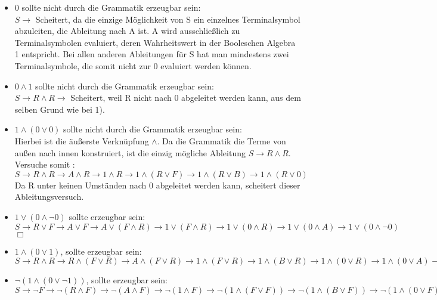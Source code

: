 \documentclass[11pt]{article}
\begin{document}
\begin{itemize}
\item[Bsp. 1:] $0$ sollte nicht durch die Grammatik erzeugbar sein:
\\$S\rightarrow$ Scheitert, da die einzige Möglichkeit von S ein einzelnes Terminalsymbol abzuleiten, die Ableitung nach A ist. A wird ausschließlich zu Terminalsymbolen evaluiert, deren Wahrheitswert in der Booleschen Algebra 1 entspricht. Bei allen anderen Ableitungen für S hat man mindestens zwei Terminalsymbole, die somit nicht zur 0 evaluiert werden können.  

\item[Bsp. 2:] $0\wedge 1$ sollte nicht durch die Grammatik erzeugbar sein:
\\$S\rightarrow R \wedge R \rightarrow $ Scheitert, weil R nicht nach 0 abgeleitet werden kann, aus dem selben Grund wie bei 1).

\item[Bsp. 3:] $1\wedge (0\vee 0)$ sollte nicht durch die Grammatik erzeugbar sein:
\\Hierbei ist die äußerste Verknüpfung $\wedge$. Da die Grammatik die Terme von außen nach innen konstruiert, ist die einzig mögliche Ableitung $S \rightarrow R\wedge R$.  
\\Versuche somit : $S\rightarrow R\wedge R \rightarrow A \wedge R\rightarrow 1 \wedge R\rightarrow 1 \wedge (R\vee F) \rightarrow 1 \wedge (R\vee B) \rightarrow 1 \wedge (R\vee 0)$
\\Da R unter keinen Umständen nach 0 abgeleitet werden kann, scheitert dieser Ableitungsversuch. 

\item[Bsp. 4:] $1 \vee (0\wedge \neg 0)$ sollte erzeugbar sein:
\\$S \rightarrow R \vee F \rightarrow A \vee F \rightarrow A \vee (F\wedge R) \rightarrow 1 \vee (F \wedge R) \rightarrow 1 \vee (0 \wedge R) \rightarrow 1 \vee (0 \wedge A) \rightarrow 1 \vee (0\wedge \neg 0)$ \hfill $\Box$

\item[Bsp. 5:] $1 \wedge (0\vee 1)$, sollte erzeugbar sein:
\\$S \rightarrow R \wedge R \rightarrow R \wedge (F \vee R) \rightarrow A \wedge (F \vee R) \rightarrow 1 \wedge (F \vee R)\rightarrow 1 \wedge (B \vee R) \rightarrow 1 \wedge (0 \vee R) \rightarrow 1 \wedge (0 \vee A) \rightarrow 1 \wedge (0 \vee 1)$
\item[Bsp. 6:] $\neg (1 \wedge (0\vee \neg1))$, sollte erzeugbar sein:
\\$S \rightarrow \neg F \rightarrow \neg (R \wedge F) \rightarrow \neg (A \wedge F) \rightarrow \neg (1 \wedge F) \rightarrow \neg (1 \wedge (F \vee F)) \rightarrow \neg (1 \wedge (B \vee F)) \rightarrow \neg (1 \wedge (0 \vee F)) \rightarrow \neg (1 \wedge (0 \vee B)) \rightarrow \neg (1 \wedge (0 \vee \neg 1))$

\end{itemize} 
\end{document}
